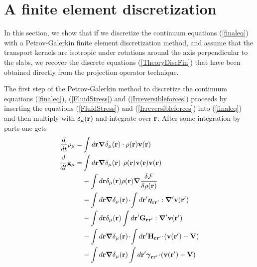 \documentclass[b5paper,openright,10pt]{book}
\newcommand{\esc}{\!\cdot\!}
\begin{document}
\section{A finite element discretization}
\label{Sec:Galerkin}
In this section, we show that if we discretize the continuum equations
(\ref{finaleq}) with  a Petrov-Galerkin finite  element discretization
method,  and assume  that the  transport kernels  are isotropic  under
rotations  around the axis  perpendicular  to the  slabs,  we recover  the
discrete equations (\ref{TheoryDiscFin}) that have been obtained directly
from the projection operator technique.

The  first  step  of  the Petrov-Galerkin  method  to  discretize  the
continuum  equations  (\ref{finaleq}),  (\ref{FluidStress}) and (\ref{Irreversibleforces})  proceeds  by
inserting the equations (\ref{FluidStress}) and (\ref{Irreversibleforces}) into (\ref{finaleq}) and then multiply with
$\delta_\mu({\bf  r})$  and  integrate  over ${\bf  r}$.   After  some
integration by parts one gets
\begin{align}
\frac{d}{dt}\rho_\mu=&\int d{\bf r}\boldsymbol{\nabla}\delta_\mu({\bf r})\cdot\rho({\bf r}){\bf v}({\bf r})
\nonumber\\
\frac{d}{dt}{\bf g}_\mu=&\int d{\bf r}\boldsymbol{\nabla}\delta_\mu({\bf r})\esc\rho({\bf r}){\bf v}({\bf r}){\bf v}({\bf r})
\nonumber\\
&-\int d{\bf r}\delta_\mu({\bf r})\rho({\bf r})\boldsymbol{\nabla}\frac{\delta{\cal F}}{\delta\rho({\bf r})}
\nonumber\\
&-\int d{\bf r}\boldsymbol{\nabla}\delta_\mu({\bf r})\esc
\int d{\bf r}'\boldsymbol{\eta}_{{\bf r}{\bf r}'}:{\boldsymbol{\nabla}^\prime}{\bf v}({\bf r}')
\nonumber\\
&-\int d{\bf r}\delta_\mu({\bf r})\int d{\bf r}'{\bf G}_{{\bf r}{\bf r}'}:
{\boldsymbol{\nabla}^\prime} {\bf v}({\bf r}')
\nonumber\\
&-\int d{\bf r}\boldsymbol{\nabla}\delta_\mu({\bf r})\esc \int d{\bf r}'{\bf H}_{{\bf r}{\bf r}'}
\esc ( {\bf v}({\bf r}')-{\bf V})
\nonumber\\
&-\int d{\bf r}\boldsymbol{\nabla}\delta_\mu({\bf r})\int d{\bf r}'
\boldsymbol{\gamma}_{{\bf r}{\bf r}'}\esc( {\bf v}({\bf r}')
-{\bf V})
\label{fulldelta}
\end{align}
\end{document}
